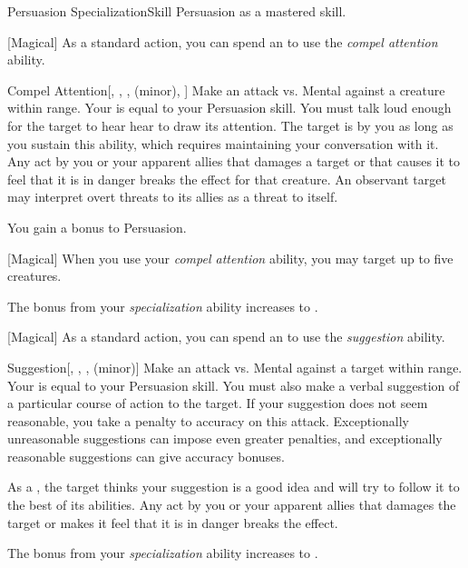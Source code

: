     \begin{feat}{Persuasion Specialization}{Skill}
        \featpre Persuasion as a mastered skill.

        [Magical] As a standard action, you can spend an  to use the \textit{compel attention} ability.
        \begin{ability}{Compel Attention}[, , ,  (minor), ]
            Make an attack vs. Mental against a creature within \rngmed range.
            Your  is equal to your Persuasion skill.
            You must talk loud enough for the target to hear hear to draw its attention.
            \hit The target is  by you as long as you sustain this ability, which requires maintaining your conversation with it.
            Any act by you or your apparent allies that damages a target or that causes it to feel that it is in danger breaks the effect for that creature.
            An observant target may interpret overt threats to its allies as a threat to itself.
        \end{ability}

         You gain a  bonus to Persuasion.

        [Magical] When you use your \textit{compel attention} ability, you may target up to five creatures.

         The bonus from your \textit{specialization} ability increases to .

        [Magical] As a standard action, you can spend an  to use the \textit{suggestion} ability.
        \begin{ability}{Suggestion}[, , ,  (minor)]
            Make an attack vs. Mental against a target within \rngmed range.
            Your  is equal to your Persuasion skill.
            You must also make a verbal suggestion of a particular course of action to the target.
            If your suggestion does not seem reasonable, you take a  penalty to accuracy on this attack.
            Exceptionally unreasonable suggestions can impose even greater penalties, and exceptionally reasonable suggestions can give accuracy bonuses.

            \hit As a , the target thinks your suggestion is a good idea and will try to follow it to the best of its abilities.
            Any act by you or your apparent allies that damages the target or makes it feel that it is in danger breaks the effect.

        \end{ability}

         The bonus from your \textit{specialization} ability increases to .
    \end{feat}

